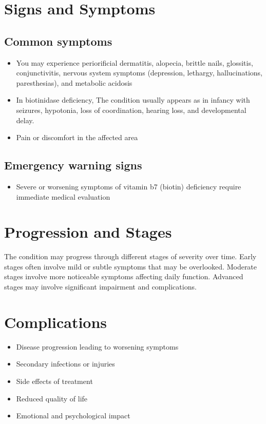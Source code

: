 \section{Signs and Symptoms}
\subsection{Common symptoms}
\begin{itemize}[noitemsep]
  \item You may experience periorificial dermatitis, alopecia, brittle nails, glossitis, conjunctivitis, nervous system symptoms (depression, lethargy, hallucinations, paresthesias), and metabolic acidosis
  \item In biotinidase deficiency, The condition usually appears as in infancy with seizures, hypotonia, loss of coordination, hearing loss, and developmental delay.
  \item Pain or discomfort in the affected area
  \end{itemize}
\subsection{Emergency warning signs}
\begin{itemize}[noitemsep]
  \item Severe or worsening symptoms of vitamin b7 (biotin) deficiency require immediate medical evaluation
\end{itemize}
\section{Progression and Stages}
The condition may progress through different stages of severity over time. Early stages often involve mild or subtle symptoms that may be overlooked. Moderate stages involve more noticeable symptoms affecting daily function. Advanced stages may involve significant impairment and complications.
\section{Complications}
\begin{itemize}[noitemsep]
  \item Disease progression leading to worsening symptoms
  \item Secondary infections or injuries
  \item Side effects of treatment
  \item Reduced quality of life
  \item Emotional and psychological impact
\end{itemize}
